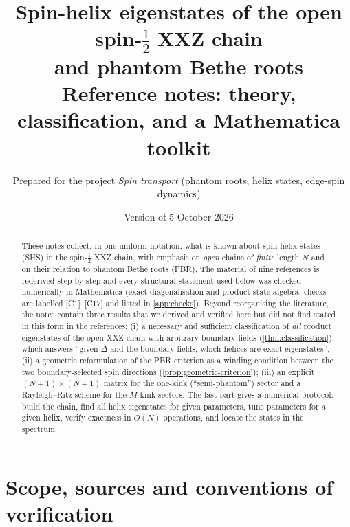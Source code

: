 \documentclass[11pt,a4paper]{article}
\title{Spin-helix eigenstates of the open spin-$\tfrac12$ XXZ chain\\ and phantom Bethe roots\\[4pt]
\large Reference notes: theory, classification, and a Mathematica toolkit}
\author{Prepared for the project \emph{Spin transport} (phantom roots, helix states, edge-spin dynamics)}
\date{Version of 5 October 2026}
\theoremstyle{definition}
\newcommand{\ver}[1]{\textsf{[#1]}}   %
\begin{document}
\maketitle
\sloppy

\begin{abstract}
These notes collect, in one uniform notation, what is known about spin-helix states (SHS) in the spin-$\tfrac12$ XXZ chain, with emphasis on \emph{open} chains of \emph{finite} length $N$ and on their relation to phantom Bethe roots (PBR). The material of nine references is rederived step by step and every structural statement used below was checked numerically in Mathematica (exact diagonalisation and product-state algebra; checks are labelled \ver{C1}--\ver{C17} and listed in \cref{app:checks}). Beyond reorganising the literature, the notes contain three results that we derived and verified here but did not find stated in this form in the references: (i) a necessary and sufficient classification of \emph{all} product eigenstates of the open XXZ chain with arbitrary boundary fields (\cref{thm:classification}), which answers ``given $\Delta$ and the boundary fields, which helices are exact eigenstates''; (ii) a geometric reformulation of the PBR criterion as a winding condition between the two boundary-selected spin directions (\cref{prop:geometric-criterion}); (iii) an explicit $(N+1)\times(N+1)$ matrix for the one-kink (``semi-phantom'') sector and a Rayleigh--Ritz scheme for the $M$-kink sectors. The last part gives a numerical protocol: build the chain, find all helix eigenstates for given parameters, tune parameters for a given helix, verify exactness in $O(N)$ operations, and locate the states in the spectrum.
\end{abstract}

\tableofcontents

\section{Scope, sources and conventions of verification}\label{sec:scope}
\end{document}
